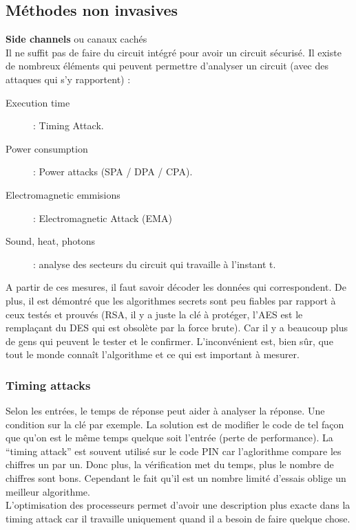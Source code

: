 \documentclass[a4paper,12pt]{article}
\begin{document}
\subsection{Méthodes non invasives}
\large{\textbf{Side channels} ou canaux cachés} \\
\normalsize
Il ne suffit pas de faire du circuit intégré pour avoir un circuit sécurisé. Il existe de nombreux éléments qui peuvent permettre d'analyser un circuit (avec des attaques qui s'y rapportent) :
\begin{description}
\item[Execution time] : Timing Attack.
\item[Power consumption] : Power attacks (SPA / DPA / CPA).
\item[Electromagnetic emmisions] : Electromagnetic Attack (EMA)
\item[Sound, heat, photons] : analyse des secteurs du circuit qui travaille à l'instant t.
\end{description}

A partir de ces mesures, il faut savoir décoder les données qui correspondent. 
De plus, il est démontré que les algorithmes secrets sont peu fiables par rapport à ceux testés et prouvés (RSA, il y a juste la clé à protéger, l'AES est le remplaçant du DES qui est obsolète par la force brute). Car il y a beaucoup plus de gens qui peuvent le tester et le confirmer. L'inconvénient est, bien sûr, que tout le monde connaît l'algorithme et ce qui est important à mesurer.

\subsubsection{Timing attacks}
Selon les entrées, le temps de réponse peut aider à analyser la réponse. Une condition sur la clé par exemple. La solution est de modifier le code de tel façon que qu'on est le même temps quelque soit l'entrée (perte de performance).
La ``timing attack'' est souvent utilisé sur le code PIN car l'aglorithme compare les chiffres un par un. Donc plus, la vérification met du temps, plus le nombre de chiffres sont bons.
Cependant le fait qu'il est un nombre limité d'essais oblige un meilleur algorithme. \\
L'optimisation des processeurs permet d'avoir une description plus exacte dans la timing attack car il travaille uniquement quand il a besoin de faire quelque chose.
\end{document}
